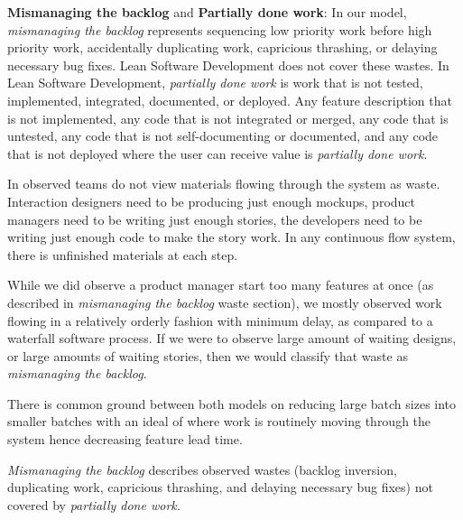 \textbf{Mismanaging the backlog} and \textbf{Partially done work}: In our model, \textit{mismanaging the backlog} represents sequencing low priority work before high priority work, accidentally duplicating work, capricious thrashing, or delaying necessary bug fixes. Lean Software Development does not cover these wastes. In Lean Software Development, \textit{partially done work} is work that is not tested, implemented, integrated, documented, or deployed. Any feature description that is not implemented, any code that is not integrated or merged, any code that is untested, any code that is not self-documenting or documented, and any code that is not deployed where the user can receive value is \textit{partially done work}.


In observed teams do not view materials flowing through the system as waste. Interaction designers need to be producing just enough mockups, product managers need to be writing just enough stories, the developers need to be writing just enough code to make the story work. In any continuous flow system, there is unfinished materials at each step. 


While we did observe a product manager start too many features at once (as described in \textit{mismanaging the backlog} waste section), we mostly observed work flowing in a relatively orderly fashion with minimum delay, as compared to a waterfall software process. If we were to observe large amount of waiting designs, or large amounts of waiting stories, then we would classify that waste as \textit{mismanaging the backlog}.


There is common ground between both models on reducing large batch sizes into smaller batches with an ideal of   where work is routinely moving through the system hence decreasing feature lead time. 


\textit{Mismanaging the backlog} describes observed wastes (backlog inversion, duplicating work, capricious thrashing, and delaying necessary bug fixes) not covered by \textit{partially done work.}








